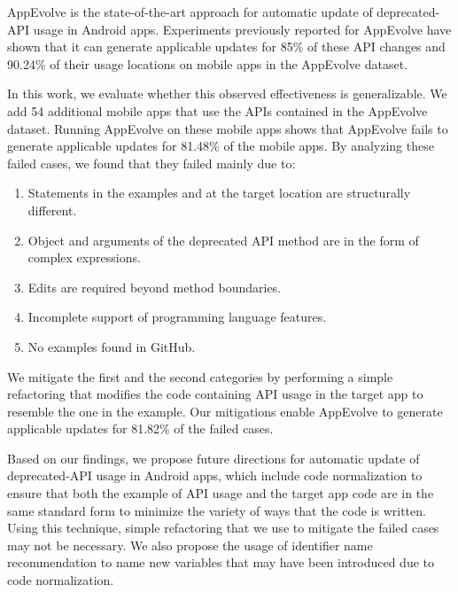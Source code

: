 AppEvolve is the state-of-the-art approach for automatic update of
deprecated-API usage in Android apps. Experiments previously reported for
AppEvolve have shown that it can generate applicable updates for
85\%  of these API
changes and 90.24\% of their usage locations on mobile apps in the
AppEvolve dataset.

In this work, we evaluate whether this observed effectiveness is
generalizable. We add 54 additional mobile apps that use the APIs contained
in the AppEvolve dataset. Running AppEvolve on these mobile apps shows that
AppEvolve fails to generate applicable updates for 81.48\% of the mobile
apps. By analyzing these failed cases, we found that they failed mainly
due to:
\begin{enumerate}
    \item Statements in the examples and at the target location are structurally different.
    \item Object and arguments of the deprecated API method are in the form of complex expressions.
    \item Edits are required beyond method boundaries.
    \item Incomplete support of programming language features.
    \item No examples found in GitHub.
\end{enumerate}
We mitigate the first and the second categories by performing a simple
refactoring that modifies the code containing API usage in the target app
to resemble the one in the example. Our mitigations enable AppEvolve
to generate applicable updates for 81.82\% of the failed cases.

Based on our findings, we propose future directions for automatic update of deprecated-API usage in Android apps, which include code normalization to ensure that both the example of API usage and the target app code are in the same standard form to minimize the variety of ways that the code is written. Using this technique, simple refactoring that we use to mitigate the failed cases may not be necessary. We also propose the usage of identifier name recommendation to name new variables that may have been introduced due to code normalization.
